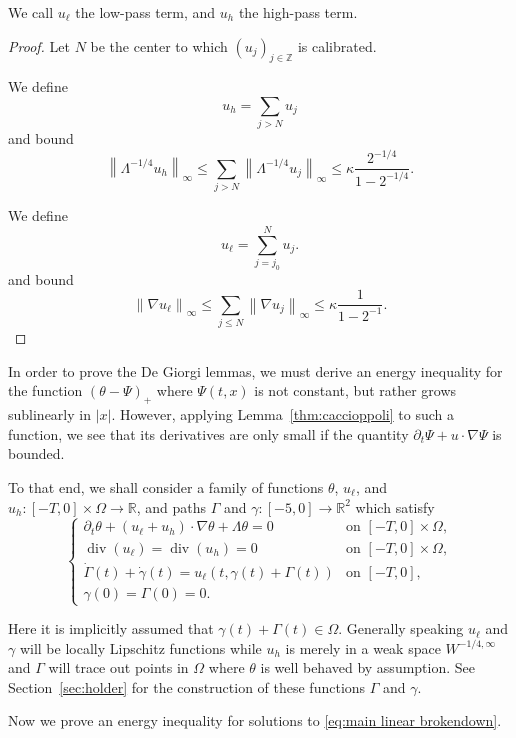 \documentclass[11pt]{amsart}
\theoremstyle{remark}
\theoremstyle{definition}
\newcommand{\R}{\mathbb{R}}
\newcommand{\Z}{\mathbb{Z}}
\newcommand{\norm}[1]{\left\lVert#1\right\rVert}
\newcommand{\paren}[1]{\left( #1 \right)}
\newcommand{\del}{\partial}
\newcommand{\grad}{\nabla}
\renewcommand{\div}{\operatorname{div}}
\newcommand{\ulow}{u_\ell}
\newcommand{\uhigh}{u_h}
\begin{document}
We call $\ulow$ the low-pass term, and $\uhigh$ the high-pass term.  

\begin{proof}
Let $N$ be the center to which $(u_j)_{j \in \Z}$ is calibrated.  

We define
\[ \uhigh = \sum_{j > N} u_j \]
and bound
\[ \norm{\Lambda^{-1/4} \uhigh}_\infty \leq \sum_{j>N} \norm{\Lambda^{-1/4} u_j}_\infty \leq \kappa \frac{2^{-1/4}}{1-2^{-1/4}}. \]

We define
\[ \ulow = \sum_{j = j_0}^N u_j. \]
and bound
\[ \norm{\grad \ulow}_\infty \leq \sum_{j \leq N} \norm{\grad u_j}_\infty \leq \kappa \frac{1}{1 - 2^{-1}}. \]
\end{proof}

In order to prove the De Giorgi lemmas, we must derive an energy inequality for the function $\paren{\theta - \Psi}_+$ where $\Psi(t,x)$ is not constant, but rather grows sublinearly in $|x|$.  However, applying Lemma~\ref{thm:caccioppoli} to such a function, we see that its derivatives are only small if the quantity $\del_t \Psi + u \cdot \grad\Psi$ is bounded.  

To that end, we shall consider a family of functions $\theta$, $\ulow$, and $\uhigh:[-T,0]\times \Omega \to \R$, and paths $\Gamma$ and $\gamma:[-5,0] \to \R^2$ which satisfy
\begin{equation} \label{eq:main linear brokendown} \begin{cases}
\del_t \theta + (\ulow + \uhigh) \cdot \grad \theta + \Lambda \theta = 0 & \textrm{on } [-T,0] \times \Omega, \\
\div( \ulow) = \div(\uhigh) = 0 & \textrm{on } [-T,0]\times \Omega, \\
\dot{\Gamma}(t) + \dot{\gamma}(t) = \ulow(t, \gamma(t) + \Gamma(t)) & \textrm{on } [-T,0], \\
\gamma(0) = \Gamma(0) = 0.
\end{cases} \end{equation}

Here it is implicitly assumed that $\gamma(t) + \Gamma(t) \in \Omega$.  Generally speaking $\ulow$ and $\gamma$ will be locally Lipschitz functions while $\uhigh$ is merely in a weak space $W^{-1/4,\infty}$ and $\Gamma$ will trace out points in $\Omega$ where $\theta$ is well behaved by assumption.  See Section~\ref{sec:holder} for the construction of these functions $\Gamma$ and $\gamma$.  

Now we prove an energy inequality for solutions to \eqref{eq:main linear brokendown}.  
\end{document}

